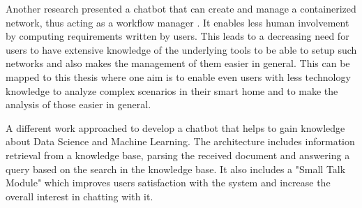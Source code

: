 Another research presented a chatbot that can create and manage a containerized network, thus acting as a workflow manager \cite{jasinski_chatbot-based_2023}.
It enables less human involvement by computing requirements written by users.
This leads to a decreasing need for users to have extensive knowledge of the underlying tools to be able to setup such networks and also makes the management of them easier in general.
This can be mapped to this thesis where one aim is to enable even users with less technology knowledge to analyze complex scenarios in their smart home and to make the analysis of those easier in general.

A different work \cite{carlander-reuterfelt_jaicob_2020} approached to develop a chatbot that helps to gain knowledge about Data Science and Machine Learning.
The architecture includes information retrieval from a knowledge base, parsing the received document and answering a query based on the search in the knowledge base.
It also includes a "Small Talk Module" which improves users satisfaction with the system and increase the overall interest in chatting with it.

